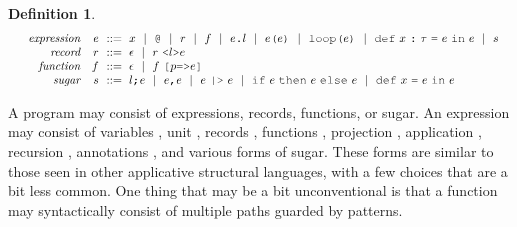 \documentclass[acmsmall]{acmart}
\theoremstyle{definition}
\newtheorem{definition}{Definition}[section]
\begin{document}
\begin{definition}
  \label{def:expression}
  \small
  \[\begin{array}[t]{rr@{}l}
    \com{expression} &
    \nonterm{e} 
    & 
    \is 
    \begin{array}[t]{@{}l}
      x \sep 
      \J{@} \sep
      r \sep
      f \sep 
      e\J{.}l \sep
      e\J{(}e\J{)} \sep
      \J{loop(}e\J{)} \sep
      \J{def}\ x\ \J{:}\ \tau\ \J{=}\ e\ \J{in}\ e \sep
      s
    \end{array}
    \\
    \com{record} &
    \nonterm{r} & \is \epsilon \sep r\ \J{<}l\J{>}e 
    \\
    \com{function} &
    \nonterm{f} & \is \epsilon \sep f\ \J{[}p\J{=>}e \J{]}
    \\
    \com{sugar} &
    \nonterm{s} 
    & 
    \is 
    \begin{array}[t]{@{}l}
      l \J{;} e \sep
      e \J{,} e \sep
      e\ \J{|>}\ e \sep
      \J{if}\ e\ \J{then}\ e\ \J{else}\ e \sep
      \J{def}\ x\ \J{=}\ e\ \J{in}\ e
    \end{array}
  \end{array}\]
\end{definition}

\noindent
A program may consist of expressions, records, functions, or sugar. 
An expression may consist of variables , unit ,
records , functions , 
projection , application , 
recursion ,
annotations ,
and various forms of sugar.
These forms are similar to those seen in other applicative structural languages,
with a few choices that are a bit less common. One thing that may be
a bit unconventional is that a function may syntactically consist of 
multiple paths guarded by patterns.  
\end{document}
